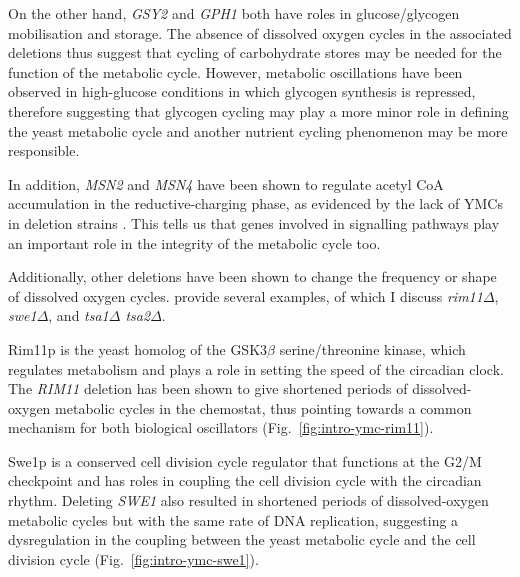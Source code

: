 On the other hand, \textit{GSY2} and \textit{GPH1} both have roles in glucose/glycogen mobilisation and storage.
The absence of dissolved oxygen cycles in the associated deletions thus suggest that cycling of carbohydrate stores may be needed for the function of the metabolic cycle.
However, metabolic oscillations have been observed in high-glucose conditions \parencite{papagiannakisAutonomousMetabolicOscillations2017, baumgartnerFlavinbasedMetabolicCycles2018} in which glycogen synthesis is repressed, therefore suggesting that glycogen cycling may play a more minor role in defining the yeast metabolic cycle and another nutrient cycling phenomenon may be more responsible.

In addition, \textit{MSN2} and \textit{MSN4} have been shown to regulate acetyl CoA accumulation in the reductive-charging phase, as evidenced by the lack of YMCs in deletion strains \parencite{kuangMsn2RegulateExpression2017}.
This tells us that genes involved in signalling pathways play an important role in the integrity of the metabolic cycle too.

Additionally, other deletions have been shown to change the frequency or shape of dissolved oxygen cycles.
\textcite{caustonMetabolicCyclesYeast2015} provide several examples, of which I discuss \textit{rim11$\Delta$}, \textit{swe1$\Delta$}, and \textit{tsa1$\Delta$ tsa2$\Delta$}. %

Rim11p is the yeast homolog of the GSK3$\beta$ serine/threonine kinase, which regulates metabolism and plays a role in setting the speed of the circadian clock.
The \textit{RIM11} deletion has been shown to give shortened periods of dissolved-oxygen metabolic cycles in the chemostat, thus pointing towards a common mechanism for both biological oscillators (Fig.\ \ref{fig:intro-ymc-rim11}).

Swe1p is a conserved cell division cycle regulator that functions at the G2/M checkpoint and has roles in coupling the cell division cycle with the circadian rhythm.
Deleting \textit{SWE1} also resulted in shortened periods of dissolved-oxygen metabolic cycles but with the same rate of DNA replication, suggesting a dysregulation in the coupling between the yeast metabolic cycle and the cell division cycle (Fig.\ \ref{fig:intro-ymc-swe1}).


